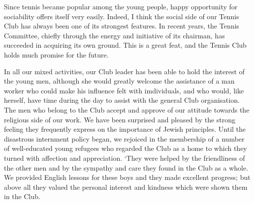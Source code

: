 Since tennis became popular among the young people,
happy opportunity for sociability offers itself very easily.
Indeed, I think the social side of our Tennis Club has
always been one of its strongest features. In recent years,
the Tennis Committee, chiefly through the energy and
initiative of its chairman, has succeeded in acquiring its
own ground. This is a great feat, and the Tennis Club
holds much promise for the future.

In all our mixed activities, our Club leader has been
able to hold the interest of the young men, although she
would greatly welcome the assistance of a man worker
who could make his influence felt with imdividuals, and
who would, like herself, have time during the day to assist
with the general Club organisation. The men who belong
to the Club accept and approve of our attitude towards
the religious side of our work. We have been surprised
and pleased by the strong feeling they frequently express
on the importance of Jewish principles. Until the
disastrous internment policy began, we rejoiced in the
membership of a number of well-educated young refugees who
regarded the Club as a home to which they turned with
affection and appreciation. ‘They were helped by the
friendliness of the other men and by the sympathy and
care they found in the Club as a whole. We provided
English lessons for these boys and they made excellent
progress; but above all they valued the personal interest
and kindness which were shown them in the Club.

